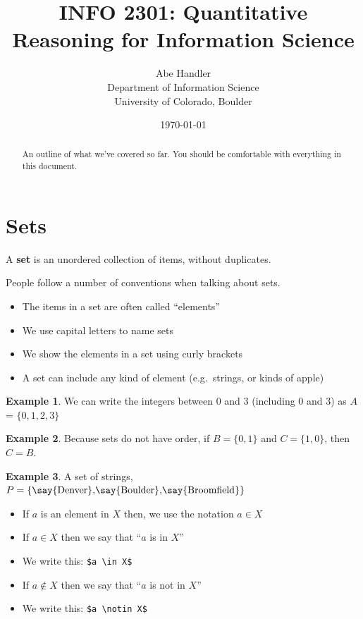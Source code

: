 \documentclass[]{article}
\theoremstyle{definition}
\newtheorem{exmp}{Example}[section]
\begin{document}
\title{INFO 2301: Quantitative Reasoning for Information Science}
\author{Abe Handler \\ Department of Information Science \\ University of Colorado, Boulder}
\date{\today}

\maketitle

\begin{abstract}
An outline of what we've covered so far. You should be comfortable with everything in this document. 
\end{abstract}

\section{Sets}

A \textbf{set} is an unordered collection of items, without duplicates. 

People follow a number of conventions when talking about sets.

\begin{itemize}
    \item The items in a set are often called ``elements''
    \item We use capital letters to name sets
    \item We show the elements in a set using curly brackets
    \item A set can include any kind of element (e.g.\ strings, or kinds of apple)
\end{itemize}

\begin{exmp}
We can write the integers between 0 and 3 (including 0 and 3) as $A$ = $\{0,1,2,3\}$
\end{exmp}

\begin{exmp}
Because sets do not have order, if $ B= \{0,1\}$ and $C=\{1,0\}$, then $C=B$.
\end{exmp}

\begin{exmp}
A set of strings, $ P= \{ \text{\say{Denver},\say{Boulder},\say{Broomfield}} \}$
\end{exmp}

\begin{itemize}
    \item If $a$ is an element in $X$ then, we use the notation $a \in X$ 
    \item If $a \in X$ then we say that ``$a$ is in $X$''
    \item We write this: \verb|$a \in X$|
    \item If $a \notin X$ then we say that ``$a$ is not in $X$''
    \item We write this: \verb|$a \notin X$|
\end{itemize}
\end{document}
